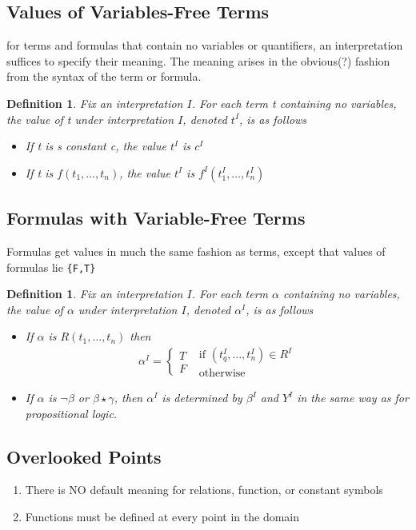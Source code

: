 \documentclass{article}
\newtheorem{definition}[theorem]{Definition}
\begin{document}
\subsection{Values of Variables-Free Terms}
for terms and formulas that contain no variables or quantifiers, an interpretation suffices to specify their meaning. The meaning arises in the obvious(?) fashion from the syntax of the term or formula.

\begin{definition}
Fix an interpretation \(I\). For each term t containing no variables, the value of t under interpretation \(I\), denoted \(t^I\), is as follows 
\begin{itemize}
\item If t is s constant c, the value \(t^I\) is \(c^I\)
\item If t is \(f(t_1, \ldots, t_n)\), the value \(t^I\) is \(f^I(t_1^I, \ldots, t_n^I)\)
\end{itemize}
\end{definition}

\subsection{Formulas with Variable-Free Terms}
Formulas get values in much the same fashion as terms, except that values of formulas lie \verb|{F,T}|

\begin{definition}
Fix an interpretation \(I\). For each term \(\alpha\) containing no variables, the value of \(\alpha\) under interpretation \(I\), denoted \(\alpha^I\), is as follows 

\begin{itemize}
\item If \(\alpha\) is \(R(t_1, \ldots, t_n)\) then 
$$ \alpha^I = \begin{cases}
T \\ F \end{cases} \begin{matrix}
\text{ if } (t_q^I, \ldots, t_n^I) \in R^I \\ \text{ otherwise } 
\end{matrix}$$
\item If \(\alpha\) is \(\neg \beta\) or \(\beta \star \gamma\), then \(\alpha^I\) is determined by \(\beta^I\) and \(Y^I\) in the same way as for propositional logic. 
\end{itemize}
\end{definition}

\subsection{Overlooked Points}
\begin{enumerate}
\item There is NO default meaning for relations, function, or constant symbols
\item Functions must be defined at every point in the domain 
\end{enumerate}
\end{document}
